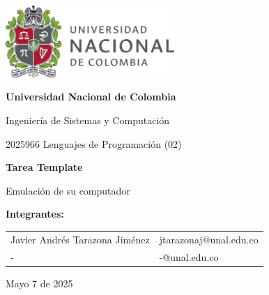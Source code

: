 \documentclass{article}
\begin{document}
\begin{titlepage}
    \centering
    \includegraphics[width=0.48\textwidth]{logo_universidad.png}
    \par\vspace{2cm}

    {\Large \textbf{Universidad Nacional de Colombia} \par}
    \vspace{0.5cm}
    {\large Ingeniería de Sistemas y Computación \par}
    {\large 2025966 Lenguajes de Programación (02)\par}
    \vspace{3cm}

    {\large \textbf{Tarea Template} \par}
    {\large Emulación de su computador\par}
    \vspace{3cm}

    {\large \textbf{Integrantes:} \par}
    \vspace{0.5cm}
    \begin{tabular}{ll}
    Javier Andrés Tarazona Jiménez & jtarazonaj@unal.edu.co \\
    - & -@unal.edu.co \\
    \end{tabular}
    \par\vspace{3cm}

    {\large Mayo 7 de 2025 \par}
\end{titlepage}

\tableofcontents %

\newpage %


\end{document}
